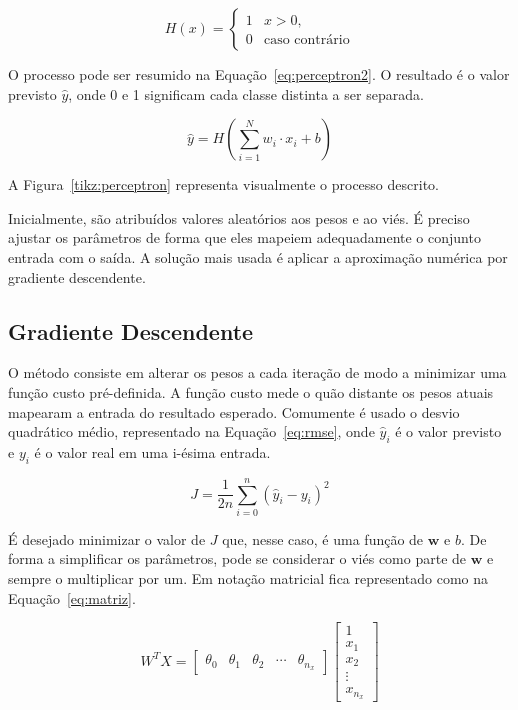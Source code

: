 \begin{equation}
	H(x) = \begin{cases}
		1 & x > 0,\\
		0 & \text{caso contrário}
	\end{cases}
	\label{eq:heavside}
\end{equation}

O processo pode ser resumido na Equação~\ref{eq:perceptron2}.  O resultado é o
valor previsto $\hat{y}$, onde 0 e 1 significam cada classe distinta a ser
separada.

\begin{equation}
	\hat{y} = H\left(\sum_{i=1}^{N} w_i \cdot x_i + b\right)
	\label{eq:perceptron2}
\end{equation}

A Figura~\ref{tikz:perceptron} representa visualmente o processo descrito.



Inicialmente, são atribuídos valores aleatórios aos pesos e ao viés.  É preciso
ajustar os parâmetros de forma que eles mapeiem adequadamente o conjunto entrada
com o saída.  A solução mais usada é aplicar a aproximação numérica
por gradiente descendente.

\subsection{Gradiente Descendente}

O método consiste em alterar os pesos a cada iteração de modo a minimizar uma
função custo pré-definida. A função custo mede o quão distante os pesos
atuais mapearam a entrada do resultado esperado. Comumente é usado o desvio
quadrático médio,
representado na Equação~\ref{eq:rmse},
onde $\hat{y}_{i}$ é o valor previsto e $y_{i}$ é o valor real em uma
i-ésima entrada.

\begin{equation}
	J = \frac{1}{2n} \sum_{i=0}^{n} {(\hat{y}_i - y_i)}^2
	\label{eq:rmse}
\end{equation}

É desejado minimizar o valor de $J$ que, nesse caso, é uma função de
$\mathbf{w}$ e $b$. De forma a simplificar os parâmetros, pode se considerar o
viés como parte de $\mathbf{w}$ e sempre o multiplicar por um. Em notação
matricial fica representado como na Equação~\ref{eq:matriz}.

\begin{equation}
	W^{T} X =
	\begin{bmatrix}
		\theta_0 & \theta_1 & \theta_2 & \cdots & \theta_{n_x}
	\end{bmatrix}
	\begin{bmatrix}
		1 \\ x_1 \\ x_2 \\ \vdots \\ x_{n_x}
	\end{bmatrix}
	\label{eq:matriz}
\end{equation}

